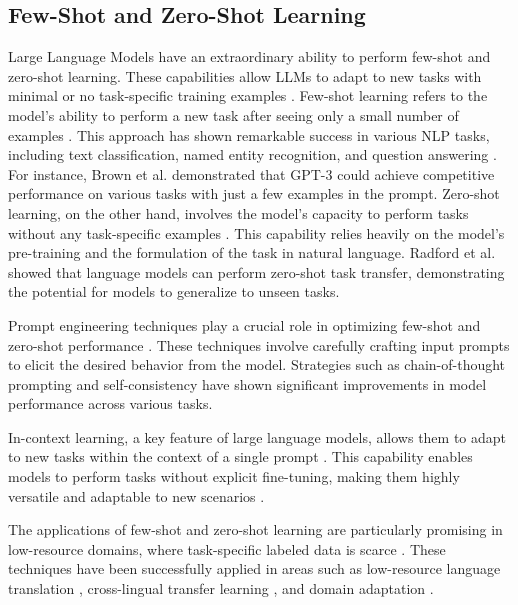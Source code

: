 \documentclass[a4paper, oneside]{discothesis}
\begin{document}
\subsection{Few-Shot and Zero-Shot Learning}
Large Language Models have an extraordinary ability to perform few-shot and zero-shot learning. These capabilities allow LLMs to adapt to new tasks with minimal or no task-specific training examples \cite{brown2020language}.
Few-shot learning refers to the model's ability to perform a new task after seeing only a small number of examples \cite{wang2020generalizing}. This approach has shown remarkable success in various NLP tasks, including text classification, named entity recognition, and question answering \cite{gao2021making}. 
For instance, Brown et al. \cite{brown2020language} demonstrated that GPT-3 could achieve competitive performance on various tasks with just a few examples in the prompt.
Zero-shot learning, on the other hand, involves the model's capacity to perform tasks without any task-specific examples \cite{xian2018zero}. 
This capability relies heavily on the model's pre-training and the formulation of the task in natural language. 
Radford et al. \cite{radford2019language} showed that language models can perform zero-shot task transfer, demonstrating the potential for models to generalize to unseen tasks.

Prompt engineering techniques play a crucial role in optimizing few-shot and zero-shot performance \cite{liu2021pre}. 
These techniques involve carefully crafting input prompts to elicit the desired behavior from the model. 
Strategies such as chain-of-thought prompting \cite{wei2022chain} and self-consistency \cite{wang2022self} have shown significant improvements in model performance across various tasks.

In-context learning, a key feature of large language models, allows them to adapt to new tasks within the context of a single prompt \cite{brown2020language}. This capability enables models to perform tasks without explicit fine-tuning, making them highly versatile and adaptable to new scenarios \cite{min2022rethinking}.

The applications of few-shot and zero-shot learning are particularly promising in low-resource domains, where task-specific labeled data is scarce \cite{hedderich2021survey}. 
These techniques have been successfully applied in areas such as low-resource language translation \cite{garcia2020multilingual}, cross-lingual transfer learning \cite{liu2020multilingual}, and domain adaptation \cite{gururangan2020don}.
\end{document}
